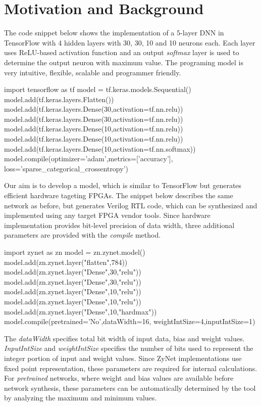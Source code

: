 \section{Motivation and Background}
\label{sec_background}

The code snippet below shows the implementation of a 5-layer DNN in TensorFlow with 4 hidden layers with 30, 30, 10 and 10 neurons each.
Each layer uses ReLU-based activation function and an output \emph{softmax} layer is used to determine the output neuron with maximum value. 
The programing model is very intuitive, flexible, scalable and programmer friendly. 

\begin{python}
import tensorflow as tf
model = tf.keras.models.Sequential()
model.add(tf.keras.layers.Flatten())
model.add(tf.keras.layers.Dense(30,activation=tf.nn.relu))
model.add(tf.keras.layers.Dense(30,activation=tf.nn.relu))
model.add(tf.keras.layers.Dense(10,activation=tf.nn.relu))
model.add(tf.keras.layers.Dense(10,activation=tf.nn.relu))
model.add(tf.keras.layers.Dense(10,activation=tf.nn.softmax))
model.compile(optimizer='adam',metrics=['accuracy'],
loss='sparse_categorical_crossentropy')
\end{python}

Our aim is to develop a model, which is similar to TensorFlow but generates efficient hardware tageting FPGAs.
The snippet below describes the same network as before, but generates Verilog RTL code, which can be synthesized and implemented using any target FPGA vendor tools.
Since hardware implementation provides bit-level precision of data width, three additional parameters are provided with the \emph{compile} method. 

\begin{python}
import zynet as zn
model = zn.zynet.model()
model.add(zn.zynet.layer("flatten",784))
model.add(zn.zynet.layer("Dense",30,"relu"))
model.add(zn.zynet.layer("Dense",30,"relu"))
model.add(zn.zynet.layer("Dense",10,"relu"))
model.add(zn.zynet.layer("Dense",10,"relu"))
model.add(zn.zynet.layer("Dense",10,"hardmax"))
model.compile(pretrained='No',dataWidth=16,
    weightIntSize=4,inputIntSize=1)
\end{python}

The \emph{dataWidth} specifies total bit width of input data, bias and weight values. \emph{InputIntSize} and \emph{weightIntSize} specifies the number of bits used to represent the integer portion of input and weight values.
Since ZyNet implementations use fixed point representation, these parameters are required for internal calculations.
For \emph{pretrained} networks, where weight and bias values are available before network synthesis, these parameters can be automatically determined by the tool by analyzing the maximum and minimum values.